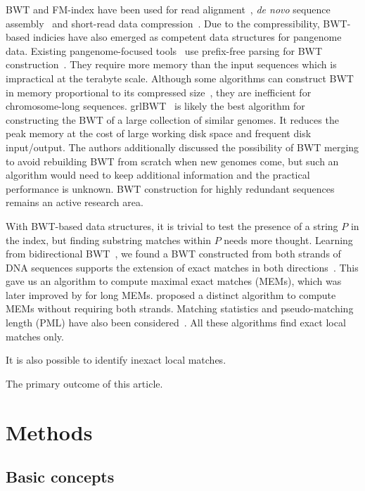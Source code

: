 \documentclass[webpdf,contemporary,large,namedate]{oup-authoring-template}%
\begin{document}
BWT and FM-index have been used for read alignment~\citep{Langmead:2009aa,Li:2009uq,Li:2009aa},
\emph{de novo} sequence assembly~\citep{Simpson:2012aa} and short-read data compression~\citep{Cox:2012ly}.
Due to the compressibility, BWT-based indicies have also emerged as competent data structures for pangenome data.
Existing pangenome-focused tools~\citep{Rossi:2022aa,Ahmed:2021aa,Zakeri:2024aa}
use prefix-free parsing for BWT construction~\citep{Boucher:2019aa}.
They require more memory than the input sequences which is impractical at the terabyte scale.
Although some algorithms can construct BWT in memory proportional to its compressed size~\citep{Li:2014ab},
they are inefficient for chromosome-long sequences.
grlBWT~\citep{DBLP:journals/iandc/DiazDominguezN23} is likely the best algorithm for constructing the BWT of a large collection of similar genomes.
It reduces the peak memory at the cost of large working disk space and frequent disk input/output.
The authors additionally discussed the possibility of BWT merging to avoid rebuilding BWT from scratch when new genomes come,
but such an algorithm would need to keep additional information and the practical performance is unknown.
BWT construction for highly redundant sequences remains an active research area.

With BWT-based data structures, it is trivial to test the presence of a string $P$ in the index,
but finding substring matches within $P$ needs more thought.
Learning from bidirectional BWT~\citep{DBLP:conf/bibm/LamLTWWY09},
we found a BWT constructed from both strands of DNA sequences supports the extension of exact matches in both directions~\citep{Li:2012fk}.
This gave us an algorithm to compute maximal exact matches (MEMs), which was later improved by \citet{DBLP:conf/dlt/Gagie24} for long MEMs.
\citet{DBLP:journals/tcs/BannaiGI20} proposed a distinct algorithm to compute MEMs without requiring both strands.
Matching statistics and pseudo-matching length (PML) have also been considered~\citep{Ahmed:2021aa}.
All these algorithms find exact local matches only.

It is also possible to identify inexact local matches.

The primary outcome of this article.

\section{Methods}

\subsection{Basic concepts}
\end{document}
